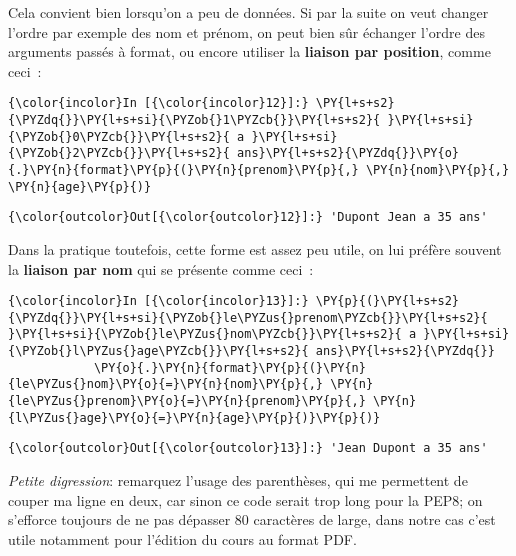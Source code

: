     Cela convient bien lorsqu'on a peu de données. Si par la suite on veut
changer l'ordre par exemple des nom et prénom, on peut bien sûr échanger
l'ordre des arguments passés à format, ou encore utiliser la
\textbf{liaison par position}, comme ceci~:

    \begin{Verbatim}[commandchars=\\\{\},frame=single,framerule=0.3mm,rulecolor=\color{cellframecolor}]
{\color{incolor}In [{\color{incolor}12}]:} \PY{l+s+s2}{\PYZdq{}}\PY{l+s+si}{\PYZob{}1\PYZcb{}}\PY{l+s+s2}{ }\PY{l+s+si}{\PYZob{}0\PYZcb{}}\PY{l+s+s2}{ a }\PY{l+s+si}{\PYZob{}2\PYZcb{}}\PY{l+s+s2}{ ans}\PY{l+s+s2}{\PYZdq{}}\PY{o}{.}\PY{n}{format}\PY{p}{(}\PY{n}{prenom}\PY{p}{,} \PY{n}{nom}\PY{p}{,} \PY{n}{age}\PY{p}{)}
\end{Verbatim}


\begin{Verbatim}[commandchars=\\\{\},frame=single,framerule=0.3mm,rulecolor=\color{cellframecolor}]
{\color{outcolor}Out[{\color{outcolor}12}]:} 'Dupont Jean a 35 ans'
\end{Verbatim}
            
    Dans la pratique toutefois, cette forme est assez peu utile, on lui
préfère souvent la \textbf{liaison par nom} qui se présente comme ceci~:

    \begin{Verbatim}[commandchars=\\\{\},frame=single,framerule=0.3mm,rulecolor=\color{cellframecolor}]
{\color{incolor}In [{\color{incolor}13}]:} \PY{p}{(}\PY{l+s+s2}{\PYZdq{}}\PY{l+s+si}{\PYZob{}le\PYZus{}prenom\PYZcb{}}\PY{l+s+s2}{ }\PY{l+s+si}{\PYZob{}le\PYZus{}nom\PYZcb{}}\PY{l+s+s2}{ a }\PY{l+s+si}{\PYZob{}l\PYZus{}age\PYZcb{}}\PY{l+s+s2}{ ans}\PY{l+s+s2}{\PYZdq{}}
            \PY{o}{.}\PY{n}{format}\PY{p}{(}\PY{n}{le\PYZus{}nom}\PY{o}{=}\PY{n}{nom}\PY{p}{,} \PY{n}{le\PYZus{}prenom}\PY{o}{=}\PY{n}{prenom}\PY{p}{,} \PY{n}{l\PYZus{}age}\PY{o}{=}\PY{n}{age}\PY{p}{)}\PY{p}{)}
\end{Verbatim}


\begin{Verbatim}[commandchars=\\\{\},frame=single,framerule=0.3mm,rulecolor=\color{cellframecolor}]
{\color{outcolor}Out[{\color{outcolor}13}]:} 'Jean Dupont a 35 ans'
\end{Verbatim}
            
    \emph{Petite digression}: remarquez l'usage des parenthèses, qui me
permettent de couper ma ligne en deux, car sinon ce code serait trop
long pour la PEP8; on s'efforce toujours de ne pas dépasser 80
caractères de large, dans notre cas c'est utile notamment pour l'édition
du cours au format PDF.

